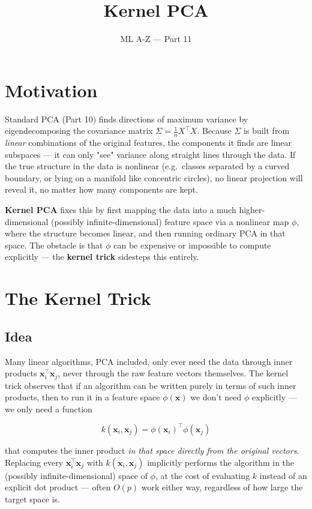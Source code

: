 \documentclass[11pt]{article}
\title{Kernel PCA}
\author{ML A-Z --- Part 11}
\date{}
\begin{document}
\maketitle

\section{Motivation}

Standard PCA (Part 10) finds directions of maximum variance by
eigendecomposing the covariance matrix $\Sigma = \frac{1}{n} X^\top X$.
Because $\Sigma$ is built from \emph{linear} combinations of the original
features, the components it finds are linear subspaces --- it can only
"see" variance along straight lines through the data. If the true
structure in the data is nonlinear (e.g.\ classes separated by a curved
boundary, or lying on a manifold like concentric circles), no linear
projection will reveal it, no matter how many components are kept.

\textbf{Kernel PCA} fixes this by first mapping the data into a much
higher-dimensional (possibly infinite-dimensional) feature space via a
nonlinear map $\phi$, where the structure becomes linear, and then running
ordinary PCA in that space. The obstacle is that $\phi$ can be expensive or
impossible to compute explicitly --- the \textbf{kernel trick} sidesteps
this entirely.

\section{The Kernel Trick}

\subsection{Idea}

Many linear algorithms, PCA included, only ever need the data through
inner products $\mathbf{x}_i^\top \mathbf{x}_j$, never through the raw
feature vectors themselves. The kernel trick observes that if an algorithm
can be written purely in terms of such inner products, then to run it in a
feature space $\phi(\mathbf{x})$ we don't need $\phi$ explicitly --- we
only need a function

\[
  k(\mathbf{x}_i, \mathbf{x}_j) = \phi(\mathbf{x}_i)^\top \phi(\mathbf{x}_j)
\]

that computes the inner product \emph{in that space directly from the
original vectors}. Replacing every $\mathbf{x}_i^\top \mathbf{x}_j$ with
$k(\mathbf{x}_i, \mathbf{x}_j)$ implicitly performs the algorithm in the
(possibly infinite-dimensional) space of $\phi$, at the cost of evaluating
$k$ instead of an explicit dot product --- often $O(p)$ work either way,
regardless of how large the target space is.
\end{document}
